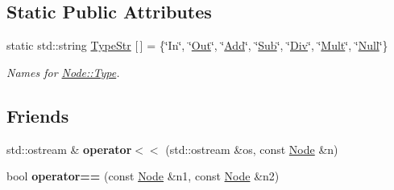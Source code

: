 \subsection*{Static Public Attributes}
\begin{DoxyCompactItemize}
\item 
static std\+::string \hyperlink{class_d_f_p_1_1_node_a528f41af98281ae51454cf666d1c04e1}{Type\+Str} \mbox{[}$\,$\mbox{]} = \{\char`\"{}In\char`\"{}, \char`\"{}\hyperlink{class_d_f_p_1_1_node_a31d945c7278c3587d6d28c76b0f1ae81ae12934d1eab7d10d4dc8c50c99b765a1}{Out}\char`\"{}, \char`\"{}\hyperlink{class_d_f_p_1_1_node_a31d945c7278c3587d6d28c76b0f1ae81afcb8ac6b8fece66ac56f16db61481373}{Add}\char`\"{}, \char`\"{}\hyperlink{class_d_f_p_1_1_node_a31d945c7278c3587d6d28c76b0f1ae81a428bc0ee7e35107ec42fb0aef0bd65b2}{Sub}\char`\"{}, \char`\"{}\hyperlink{class_d_f_p_1_1_node_a31d945c7278c3587d6d28c76b0f1ae81a05f8ddf7162817acd31d3ba843e19b07}{Div}\char`\"{}, \char`\"{}\hyperlink{class_d_f_p_1_1_node_a31d945c7278c3587d6d28c76b0f1ae81a4441f6d3c4208c97618533c2bc993b74}{Mult}\char`\"{}, \char`\"{}\hyperlink{class_d_f_p_1_1_node_a31d945c7278c3587d6d28c76b0f1ae81a627eaaffb68dd425c34104e5f8f7d381}{Null}\char`\"{}\}\hypertarget{class_d_f_p_1_1_node_a528f41af98281ae51454cf666d1c04e1}{}\label{class_d_f_p_1_1_node_a528f41af98281ae51454cf666d1c04e1}

\begin{DoxyCompactList}\small\item\em Names for \hyperlink{class_d_f_p_1_1_node_a31d945c7278c3587d6d28c76b0f1ae81}{Node\+::\+Type}. \end{DoxyCompactList}\end{DoxyCompactItemize}
\subsection*{Friends}
\begin{DoxyCompactItemize}
\item 
std\+::ostream \& {\bfseries operator$<$$<$} (std\+::ostream \&os, const \hyperlink{class_d_f_p_1_1_node}{Node} \&n)\hypertarget{class_d_f_p_1_1_node_a6fe565f8d6d1c1d44540c07e92864c91}{}\label{class_d_f_p_1_1_node_a6fe565f8d6d1c1d44540c07e92864c91}

\item 
bool {\bfseries operator==} (const \hyperlink{class_d_f_p_1_1_node}{Node} \&n1, const \hyperlink{class_d_f_p_1_1_node}{Node} \&n2)\hypertarget{class_d_f_p_1_1_node_a156456698e98563a77c4c0af13c20db1}{}\label{class_d_f_p_1_1_node_a156456698e98563a77c4c0af13c20db1}

\end{DoxyCompactItemize}


